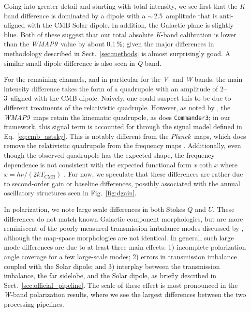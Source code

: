 \documentclass[twocolumn]{../../common/aa}
\def\WMAPnine{\emph{WMAP9}}
\def\Planck{\emph{Planck}}
\def\commanderthree{\texttt{Commander3}}
\newcommand{\K}[0]{\textit K}
\newcommand{\Q}[0]{\textit Q}
\newcommand{\V}[0]{\textit V}
\newcommand{\W}[0]{\textit W}
\begin{document}
Going into greater detail and starting with total intensity, we see first that the \K-band difference is dominated by a dipole with a $\sim$\,2.5\muK\ amplitude that is anti-aligned with the CMB Solar dipole. In addition, the Galactic plane is slightly blue. Both of these suggest that our total absolute \K-band calibration is lower than the \WMAPnine\ value by about 0.1\,\%; given the major differences in methodology described in Sect.~\ref{sec:methods} is almost surprisingly good. A similar small dipole difference is also seen in \Q-band.

For the remaining channels, and in particular for the \V- and \W-bands, the main intensity difference takes the form of a quadrupole with an amplitude of 2--3\muK\ aligned with the CMB dipole. Naively, one could suspect this to be due to different treatments of the relativistic quadruple. However, as noted by \citet{larson2014}, the \WMAPnine\ maps retain the kinematic quadrupole, as does \commanderthree; in our framework, this signal term is accounted for through the signal model defined in Eq.~\eqref{eq:cmb_astsky}. This is notably different from the \Planck\ maps, which does remove the relativistic quadrupole from the frequency maps \citep{planck2016-l02,planck2016-l03}. Additionally, even though the observed quadrupole has the expected shape, the frequency dependence is not consistent with the expected functional form $x\coth x$ where $x=h\nu/(2kT_\mathrm{CMB})$ \citep{Notari:2015}. For now, we speculate that these differences are rather due to second-order gain or baseline differences, possibly associated with the annual oscillatory structures seen in Fig.~\ref{fig:dgain}.

In polarization, we note large scale differences in both Stokes $Q$ and $U$. These differences do not match known Galactic component morphologies, but are more reminiscent of the poorly measured transmission imbalance modes discussed by \citet{jarosik2010}, although the map-space morphologies are not identical. In general, such large mode differences are due to at least three main effects: 1) incomplete polarization angle coverage for a few large-scale modes; 2) errors in transmission imbalance coupled with the Solar dipole; and 3) interplay between the transmission imbalance, the far sidelobe, and the Solar dipole, as briefly described in Sect.~\ref{sec:official_pipeline}. The scale of these effect is most pronounced in the \W-band polarization results, where we see the largest differences between the two processing pipelines.
\end{document}
